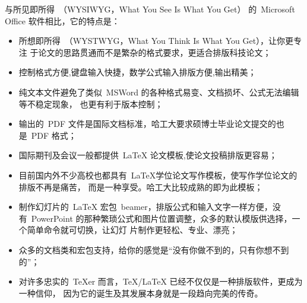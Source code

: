         与所见即所得~（WYSIWYG，What You See Is What You Get） 的~Microsoft Office
软件相比，它的特点是：
   \begin{itemize}
      \item 所想即所得~（WYSTWYG，What You Think Is What You Get），让你更专注
于论文的思路贯通而不是繁杂的格式要求，更适合排版科技论文；
      \item 控制格式方便,键盘输入快捷，数学公式输入排版方便,输出精美；
      \item 纯文本文件避免了类似~MSWord 的各种格式易变、文档损坏、公式无法编辑等不稳定现象，
      也更有利于版本控制；
      \item 输出的~PDF 文件是国际文档标准，哈工大要求硕博士毕业论文提交的也是~PDF 格式；
      \item 国际期刊及会议一般都提供~\LaTeX{} 论文模板,使论文投稿排版更容易；
      \item 目前国内外不少高校也都具有~\LaTeX{}学位论文写作模板，使写作学位论文的排版不再是痛苦，
      而是一种享受。哈工大比较成熟的即为此模板；
      \item 制作幻灯片的~LaTeX 宏包~beamer，排版公式和输入文字一样方便，没有~PowerPoint
的那种繁琐公式和图片位置调整，众多的默认模版供选择，一个简单命令就可切换，让幻灯
片制作更轻松、专业、漂亮；
      \item  众多的文档类和宏包支持，给你的感觉是``没有你做不到的，只有你想不到的''；
      \item  对许多忠实的~TeXer 而言，\TeX/\LaTeX{} 已经不仅仅是一种排版软件，更成为一种信仰，
      因为它的诞生及其发展本身就是一段趋向完美的传奇。
    \end{itemize}

